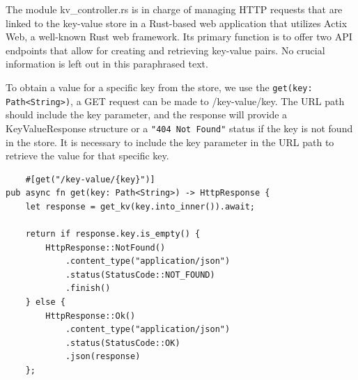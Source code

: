 \documentclass[a4paper, 11pt]{article}
\begin{document}
\par
The module kv\_controller.rs is in charge of managing HTTP requests that are linked to the key-value store in a Rust-based web application that utilizes Actix Web, a well-known Rust web framework. Its primary function is to offer two API endpoints that allow for creating and retrieving key-value pairs. No crucial information is left out in this paraphrased text.

To obtain a value for a specific key from the store, we use the \verb|get(key: Path<String>)|, a GET request can be made to /key-value/{key}. The URL path should include the key parameter, and the response will provide a KeyValueResponse structure or a \verb|"404 Not Found"| status if the key is not found in the store. It is necessary to include the key parameter in the URL path to retrieve the value for that specific key.
\begin{verbatim}
    #[get("/key-value/{key}")]
pub async fn get(key: Path<String>) -> HttpResponse {
    let response = get_kv(key.into_inner()).await;

    return if response.key.is_empty() {
        HttpResponse::NotFound()
            .content_type("application/json")
            .status(StatusCode::NOT_FOUND)
            .finish()
    } else {
        HttpResponse::Ok()
            .content_type("application/json")
            .status(StatusCode::OK)
            .json(response)
    };

\end{verbatim}
\end{document}
